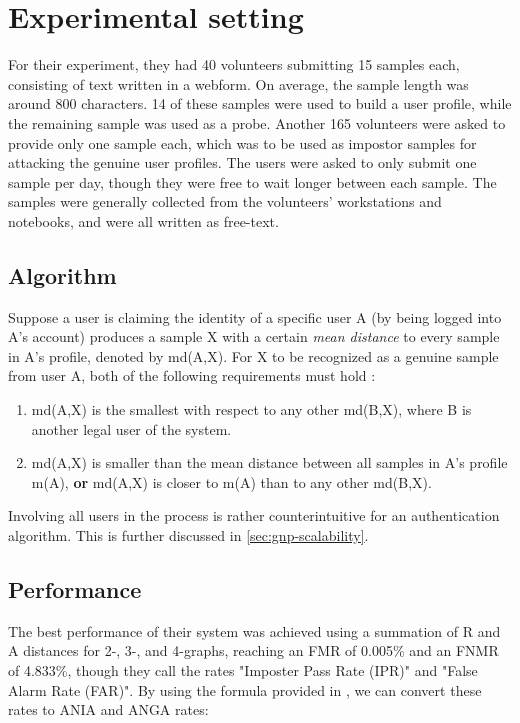 \documentclass[informationsecurity]{gucmasterproject}
\begin{document}
\section{Experimental setting}
For their experiment, they had 40 volunteers submitting 15 samples each, consisting of text written in a webform. On average, the sample length was around 800 characters.
14 of these samples were used to build a user profile, while the remaining sample was used as a probe.
Another 165 volunteers were asked to provide only one sample each, which was to be used as impostor samples for attacking the genuine user profiles.
The users were asked to only submit one sample per day, though they were free to wait longer between each sample.
The samples were generally collected from the volunteers' workstations and notebooks, and were all written as free-text.

\subsection{Algorithm}
\label{sec:gnp-algorithm}
Suppose a user is claiming the identity of a specific user A (by being logged into A's account) produces a sample X with a certain \textit{mean distance} to every sample in A's profile, denoted by md(A,X).
For X to be recognized as a genuine sample from user A, both of the following requirements must hold \cite{gnp}:

\begin{enumerate}
\item md(A,X) is the smallest with respect to any other md(B,X), where B is another legal user of the system.
\item md(A,X) is smaller than the mean distance between all samples in A's profile m(A), \textbf{or} md(A,X) is closer to m(A) than to any other md(B,X).
\end{enumerate}
Involving all users in the process is rather counterintuitive for an authentication algorithm.
This is further discussed in \cref{sec:gnp-scalability}.
\subsection{Performance}
The best performance of their system was achieved using a summation of R and A distances for 2-, 3-, and 4-graphs, reaching an FMR of 0.005\% and an FNMR of 4.833\%, though they call the rates "Imposter Pass Rate (IPR)" and "False Alarm Rate (FAR)".
By using the formula provided in \cite{CA-performance}, we can convert these rates to ANIA and ANGA rates:
\end{document}
